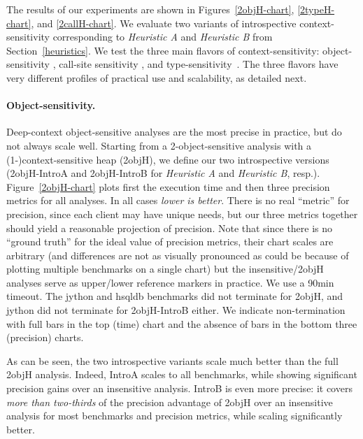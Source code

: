 The results of our experiments are shown in Figures~\ref{2objH-chart},
\ref{2typeH-chart}, and \ref{2callH-chart}. We evaluate two variants
of introspective context-sensitivity corresponding to \emph{Heuristic
  A} and \emph{Heuristic B} from Section~\ref{heuristics}. We test the
three main flavors of context-sensitivity: object-sensitivity
\cite{issta:2002:Milanova,article:2005:Milanova}, call-site sensitivity
\cite{col:1981:Sharir,thesis:Shivers}, and
type-sensitivity~\cite{popl:2011:Smaragdakis}. The three flavors have very
different profiles of practical use and scalability, as detailed next.

\paragraph{Object-sensitivity.}
Deep-context object-sensitive analyses are the most precise in
practice, but do not always scale well. Starting from a
2-object-sensitive analysis with a (1-)context-sensitive heap (2objH),
we define our two introspective versions (2objH-IntroA and
2objH-IntroB for \emph{Heuristic A} and \emph{Heuristic B},
resp.). Figure~\ref{2objH-chart} plots first the execution time and
then three precision metrics for all analyses.
In all cases \emph{lower is better}. There is no real ``metric'' for
precision, since each client may have unique needs, but our three
metrics together should yield a reasonable projection of
precision. Note that since there is no ``ground truth'' for the ideal
value of precision metrics, their chart scales are arbitrary (and
differences are not as visually pronounced as could be because of
plotting multiple benchmarks on a single chart) but the
insensitive/2objH analyses serve as upper/lower reference markers in
practice. We use a 90min timeout. The jython and hsqldb benchmarks did
not terminate for 2objH, and jython did not terminate for 2objH-IntroB
either. We indicate non-termination with full bars in the top (time)
chart and the absence of bars in the bottom three (precision) charts.

As can be seen, the two introspective variants scale much better than
the full 2objH analysis. Indeed, IntroA scales to all benchmarks,
while showing significant precision gains over an insensitive
analysis. IntroB is even more precise: it covers \emph{more than
  two-thirds} of the precision advantage of 2objH over an insensitive
analysis for most benchmarks and precision metrics, while scaling
significantly better.



